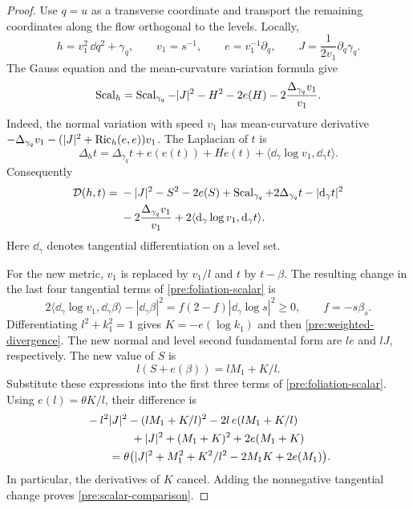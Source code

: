 \begin{proof}
Use $q=u$ as a transverse coordinate and transport the remaining
coordinates along the flow orthogonal to the levels. Locally,
\[
 h=v_1^2\,\dd q^2+\gamma_q,\qquad
 v_1=s^{-1},\qquad e=v_1^{-1}\partial_q,
 \qquad J=\frac{1}{2v_1}\partial_q\gamma_q.
\]
The Gauss equation and the mean-curvature variation formula give
\[
 \operatorname{Scal}_h=\operatorname{Scal}_{\gamma_q}-|J|^2-H^2-2e(H)
                         -2\frac{\Delta_{\gamma_q}v_1}{v_1}.
\]
Indeed, the normal variation with speed $v_1$ has mean-curvature
derivative $-\Delta_{\gamma_q}v_1-(|J|^2+\operatorname{Ric}_h(e,e))v_1$.
The Laplacian of $t$ is
\[
 \Delta_ht=\Delta_{\gamma_q}t+e(e(t))+He(t)
       +\langle\dd_\gamma\log v_1,\dd_\gamma t\rangle.
\]
Consequently
\begin{equation}\label{pre:foliation-scalar}
 \begin{split}
 \mathcal D(h,t)={}&-|J|^2-S^2-2e(S)
       +\operatorname{Scal}_{\gamma_q}+2\Delta_{\gamma_q}t-|\mathrm d_\gamma t|^2\\
 &-2\frac{\Delta_{\gamma_q}v_1}{v_1}
       +2\langle\mathrm d_\gamma\log v_1,\mathrm d_\gamma t\rangle.
 \end{split}
\end{equation}
Here $\dd_\gamma$ denotes tangential differentiation on a level set.

For the new metric, $v_1$ is replaced by $v_1/l$ and $t$ by $t-\beta$.
The resulting change in the last four tangential terms of
\eqref{pre:foliation-scalar} is
\[
 2\langle\dd_\gamma\log v_1,\dd_\gamma\beta\rangle
       -|\dd_\gamma\beta|^2
   =f(2-f)|\dd_\gamma\log s|^2\ge0,
 \qquad f=-s\beta_s.
\]
Differentiating $l^2+k_1^2=1$ gives $K=-e(\log k_1)$ and then
\eqref{pre:weighted-divergence}. The new normal and level second
fundamental form are $le$ and $lJ$, respectively. The new value of $S$ is
\[
 l(S+e(\beta))=lM_1+K/l.
\]
Substitute these expressions into the first three terms of
\eqref{pre:foliation-scalar}. Using $e(l)=\theta K/l$, their difference is
\[
 \begin{split}
 &-l^2|J|^2-(lM_1+K/l)^2-2l\,e(lM_1+K/l)\\
 &\hspace{14mm}+|J|^2+(M_1+K)^2+2e(M_1+K)\\
 &\qquad=\theta\bigl(|J|^2+M_1^2+K^2/l^2-2M_1K+2e(M_1)\bigr).
 \end{split}
\]
In particular, the derivatives of $K$ cancel. Adding the nonnegative
tangential change proves \eqref{pre:scalar-comparison}.
\end{proof}

